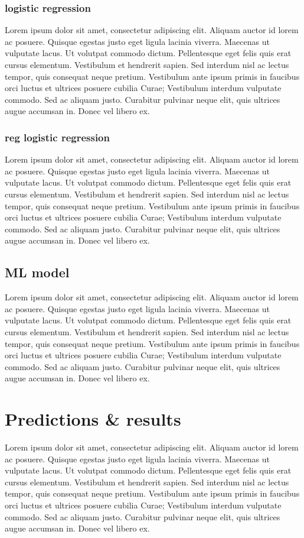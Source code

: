 \documentclass[11pt,a4paper]{article}
\begin{document}
\subsubsection{logistic regression}
Lorem ipsum dolor sit amet, consectetur adipiscing elit. Aliquam auctor id lorem ac posuere. Quisque egestas justo eget ligula lacinia viverra. Maecenas ut vulputate lacus. Ut volutpat commodo dictum. Pellentesque eget felis quis erat cursus elementum. Vestibulum et hendrerit sapien. Sed interdum nisl ac lectus tempor, quis consequat neque pretium. Vestibulum ante ipsum primis in faucibus orci luctus et ultrices posuere cubilia Curae; Vestibulum interdum vulputate commodo. Sed ac aliquam justo. Curabitur pulvinar neque elit, quis ultrices augue accumsan in. Donec vel libero ex. 

\subsubsection{reg logistic regression}
Lorem ipsum dolor sit amet, consectetur adipiscing elit. Aliquam auctor id lorem ac posuere. Quisque egestas justo eget ligula lacinia viverra. Maecenas ut vulputate lacus. Ut volutpat commodo dictum. Pellentesque eget felis quis erat cursus elementum. Vestibulum et hendrerit sapien. Sed interdum nisl ac lectus tempor, quis consequat neque pretium. Vestibulum ante ipsum primis in faucibus orci luctus et ultrices posuere cubilia Curae; Vestibulum interdum vulputate commodo. Sed ac aliquam justo. Curabitur pulvinar neque elit, quis ultrices augue accumsan in. Donec vel libero ex.

\subsection{ML model}
Lorem ipsum dolor sit amet, consectetur adipiscing elit. Aliquam auctor id lorem ac posuere. Quisque egestas justo eget ligula lacinia viverra. Maecenas ut vulputate lacus. Ut volutpat commodo dictum. Pellentesque eget felis quis erat cursus elementum. Vestibulum et hendrerit sapien. Sed interdum nisl ac lectus tempor, quis consequat neque pretium. Vestibulum ante ipsum primis in faucibus orci luctus et ultrices posuere cubilia Curae; Vestibulum interdum vulputate commodo. Sed ac aliquam justo. Curabitur pulvinar neque elit, quis ultrices augue accumsan in. Donec vel libero ex.

\section{Predictions \& results}
Lorem ipsum dolor sit amet, consectetur adipiscing elit. Aliquam auctor id lorem ac posuere. Quisque egestas justo eget ligula lacinia viverra. Maecenas ut vulputate lacus. Ut volutpat commodo dictum. Pellentesque eget felis quis erat cursus elementum. Vestibulum et hendrerit sapien. Sed interdum nisl ac lectus tempor, quis consequat neque pretium. Vestibulum ante ipsum primis in faucibus orci luctus et ultrices posuere cubilia Curae; Vestibulum interdum vulputate commodo. Sed ac aliquam justo. Curabitur pulvinar neque elit, quis ultrices augue accumsan in. Donec vel libero ex.
\end{document}
